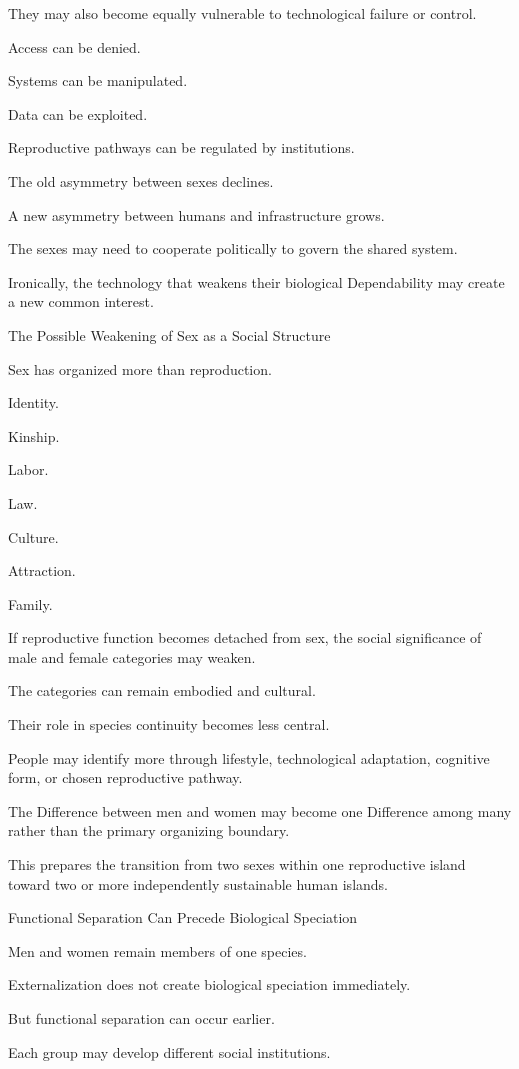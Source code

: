 They may also become equally vulnerable to technological failure or control.

Access can be denied.

Systems can be manipulated.

Data can be exploited.

Reproductive pathways can be regulated by institutions.

The old asymmetry between sexes declines.

A new asymmetry between humans and infrastructure grows.

The sexes may need to cooperate politically to govern the shared system.

Ironically, the technology that weakens their biological Dependability may create a new common interest.

The Possible Weakening of Sex as a Social Structure

Sex has organized more than reproduction.

Identity.

Kinship.

Labor.

Law.

Culture.

Attraction.

Family.

If reproductive function becomes detached from sex, the social significance of male and female categories may weaken.

The categories can remain embodied and cultural.

Their role in species continuity becomes less central.

People may identify more through lifestyle, technological adaptation, cognitive form, or chosen reproductive pathway.

The Difference between men and women may become one Difference among many rather than the primary organizing boundary.

This prepares the transition from two sexes within one reproductive island toward two or more independently sustainable human islands.

Functional Separation Can Precede Biological Speciation

Men and women remain members of one species.

Externalization does not create biological speciation immediately.

But functional separation can occur earlier.

Each group may develop different social institutions.


